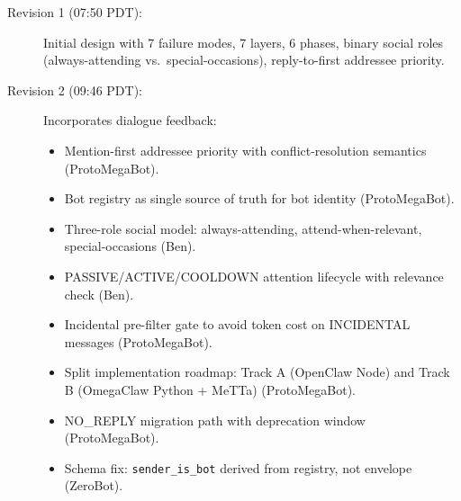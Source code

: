 \documentclass[11pt]{article}
\begin{document}
\begin{description}
\item[Revision 1 (07:50 PDT):] Initial design with 7 failure modes, 7 layers,
6 phases, binary social roles (always-attending vs.\ special-occasions),
reply-to-first addressee priority.
\item[Revision 2 (09:46 PDT):] Incorporates dialogue feedback:
\begin{itemize}
\item Mention-first addressee priority with conflict-resolution semantics
(ProtoMegaBot).
\item Bot registry as single source of truth for bot identity (ProtoMegaBot).
\item Three-role social model: always-attending, attend-when-relevant,
special-occasions (Ben).
\item PASSIVE/ACTIVE/COOLDOWN attention lifecycle with relevance check (Ben).
\item Incidental pre-filter gate to avoid token cost on INCIDENTAL messages
(ProtoMegaBot).
\item Split implementation roadmap: Track A (OpenClaw Node) and Track B
(OmegaClaw Python + MeTTa) (ProtoMegaBot).
\item NO\_REPLY migration path with deprecation window (ProtoMegaBot).
\item Schema fix: \texttt{sender\_is\_bot} derived from registry, not envelope
(ZeroBot).
\end{itemize}
\end{description}
\end{document}
